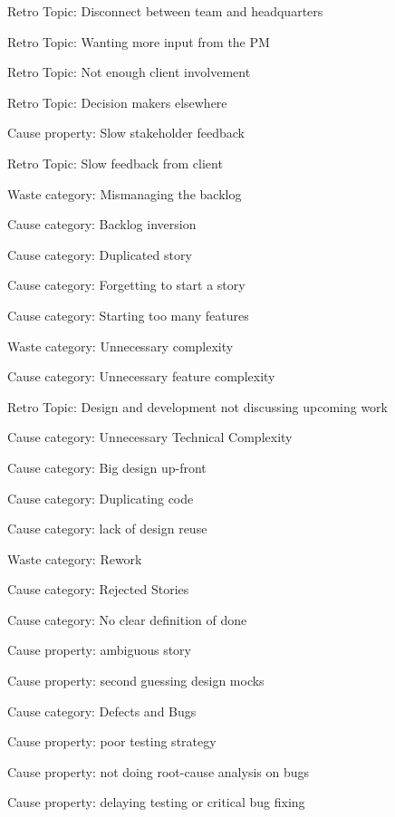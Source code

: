 \quad \quad \quad Retro Topic: Disconnect between team and headquarters

\quad \quad \quad Retro Topic: Wanting more input from the PM

\quad \quad \quad Retro Topic: Not enough client involvement

\quad \quad \quad Retro Topic: Decision makers elsewhere

\quad \quad Cause property: Slow stakeholder feedback

\quad \quad \quad Retro Topic: Slow feedback from client

Waste category: Mismanaging the backlog


\quad Cause category: Backlog inversion

\quad Cause category: Duplicated story

\quad Cause category: Forgetting to start a story

\quad Cause category: Starting too many features


Waste category: Unnecessary complexity

\quad Cause category: Unnecessary feature complexity

\quad \quad Retro Topic: Design and development not discussing upcoming work

\quad Cause category: Unnecessary Technical Complexity

\quad Cause category: Big design up-front

\quad Cause category: Duplicating code

\quad Cause category: lack of design reuse


Waste category: Rework


\quad Cause category: Rejected Stories

\quad Cause category: No clear definition of done

\quad \quad Cause property: ambiguous story

\quad \quad Cause property: second guessing design mocks

\quad Cause category: Defects and Bugs

\quad \quad Cause property: poor testing strategy

\quad \quad Cause property: not doing root-cause analysis on bugs

\quad \quad Cause property: delaying testing or critical bug fixing

%
%


